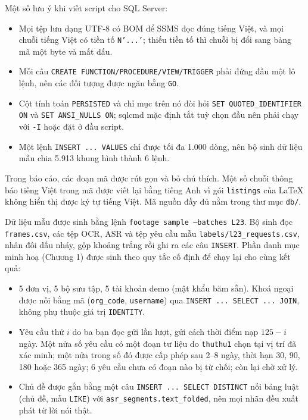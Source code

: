 Một số lưu ý khi viết script cho SQL Server:
\begin{itemize}
    \item Mọi tệp lưu dạng UTF-8 có BOM để SSMS đọc đúng tiếng Việt, và mọi chuỗi tiếng Việt
    có tiền tố \texttt{N'...'}; thiếu tiền tố thì chuỗi bị đổi sang bảng mã một byte và mất dấu.
    \item Mỗi câu \texttt{CREATE FUNCTION/PROCEDURE/VIEW/TRIGGER} phải đứng đầu một lô lệnh,
    nên các đối tượng được ngăn bằng \texttt{GO}.
    \item Cột tính toán \texttt{PERSISTED} và chỉ mục trên nó đòi hỏi
    \texttt{SET QUOTED\_IDENTIFIER ON} và \texttt{SET ANSI\_NULLS ON}; sqlcmd mặc định tắt
    tuỳ chọn đầu nên phải chạy với \texttt{-I} hoặc đặt ở đầu script.
    \item Một lệnh \texttt{INSERT ... VALUES} chỉ được tối đa 1.000 dòng, nên bộ sinh dữ liệu
    mẫu chia 5.913 khung hình thành 6 lệnh.
\end{itemize}

Trong báo cáo, các đoạn mã được rút gọn và bỏ chú thích. Một số chuỗi thông báo tiếng Việt
trong mã được viết lại bằng tiếng Anh vì gói \texttt{listings} của \LaTeX{} không hiển thị
được ký tự tiếng Việt. Mã nguồn đầy đủ nằm trong thư mục \texttt{db/}.

Dữ liệu mẫu được sinh bằng lệnh \texttt{footage sample --batches L23}. Bộ sinh đọc
\texttt{frames.csv}, các tệp OCR, ASR và tệp yêu cầu mẫu \texttt{labels/l23\_requests.csv},
nhân đôi dấu nháy, gộp khoảng trắng rồi ghi ra các câu \texttt{INSERT}. Phần danh mục minh
hoạ (Chương 1) được sinh theo quy tắc cố định để chạy lại cho cùng kết quả:
\begin{itemize}
    \item 5 đơn vị, 5 bộ sưu tập, 5 tài khoản demo (mật khẩu băm sẵn). Khoá ngoại được nối
    bằng mã (\texttt{org\_code}, \texttt{username}) qua \texttt{INSERT ... SELECT ... JOIN},
    không phụ thuộc giá trị \texttt{IDENTITY}.
    \item Yêu cầu thứ $i$ do ba bạn đọc gửi lần lượt, gửi cách thời điểm nạp $125 - i$ ngày.
    Một nửa số yêu cầu có một đoạn tư liệu do \texttt{thuthu1} chọn tại vị trí đã xác minh;
    một nửa trong số đó được cấp phép sau 2--8 ngày, thời hạn 30, 90, 180 hoặc 365 ngày; 6 yêu
    cầu chưa có đoạn nào bị từ chối; còn lại chờ xử lý.
    \item Chủ đề được gắn bằng một câu \texttt{INSERT ... SELECT DISTINCT} nối bảng luật
    (chủ đề, mẫu \texttt{LIKE}) với \texttt{asr\_segments.text\_folded}, nên mọi nhãn đều
    xuất phát từ lời nói thật.
\end{itemize}

